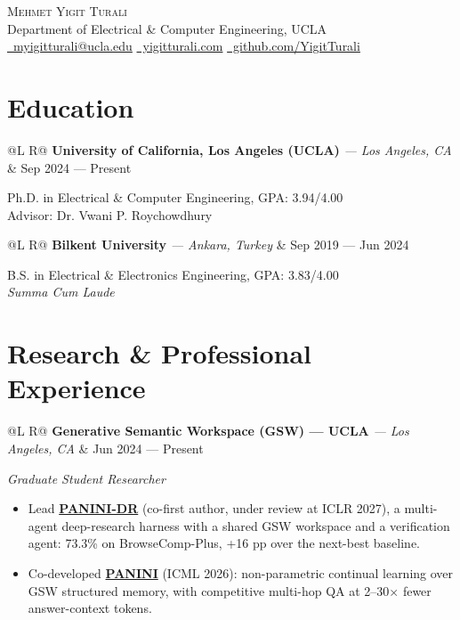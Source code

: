 \documentclass[letterpaper,10pt]{article}
\makeatletter
\newcommand{\dotsep}{\hspace{0.35em}\textbar\hspace{0.35em}} %
\newcommand{\role}[1]{\emph{#1}}
\newcommand{\entryinline}[3]{%
  \begin{tabularx}{\linewidth}{@{}L R@{}}%
    \textbf{#1} \textit{— #2} & \small #3\\
  \end{tabularx}%
}
\makeatother
\begin{document}
\begin{center}
  {\Large \scshape Mehmet Yigit Turali}\\[-1pt]
  Department of Electrical \& Computer Engineering, UCLA\\[-1pt]
  \href{mailto:myigitturali@ucla.edu}{\faEnvelope\ myigitturali@ucla.edu}
  \dotsep \href{https://www.yigitturali.com/}{\faGlobeAmericas\ yigitturali.com}
  \dotsep \href{https://github.com/YigitTurali}{\faGithub\ github.com/YigitTurali}
\end{center}
\vspace{-2pt}

\begin{minipage}[t]{0.60\textwidth}

\section{Education}
\entryinline{University of California, Los Angeles (UCLA)}{Los Angeles, CA}{Sep 2024 — Present}
Ph.D. in Electrical \& Computer Engineering, GPA: 3.94/4.00 \\
Advisor: Dr. Vwani P. Roychowdhury

\medskip
\entryinline{Bilkent University}{Ankara, Turkey}{Sep 2019 — Jun 2024}
B.S. in Electrical \& Electronics Engineering, GPA: 3.83/4.00 \\
\emph{Summa Cum Laude}

\section{Research \& Professional Experience}

\entryinline{Generative Semantic Workspace (GSW) — UCLA}{Los Angeles, CA}{Jun 2024 — Present}
\role{Graduate Student Researcher}
\begin{itemize}
  \item Lead \href{https://arxiv.org/abs/2610.15208}{\textbf{PANINI-DR}} (co-first author, under review at ICLR 2027), a multi-agent deep-research harness with a shared GSW workspace and a verification agent: 73.3\% on BrowseComp-Plus, +16 pp over the next-best baseline.
  \item Co-developed \href{https://arxiv.org/abs/2602.15156}{\textbf{PANINI}} (ICML 2026): non-parametric continual learning over GSW structured memory, with competitive multi-hop QA at 2--30$\times$ fewer answer-context tokens.
\end{itemize}


\end{minipage}
\end{document}
